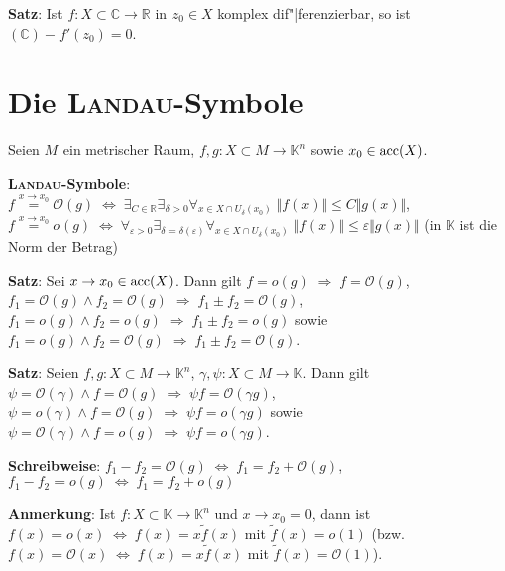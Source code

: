 \textbf{Satz}: Ist $f: X \subset \mathbb{C} \rightarrow \mathbb{R}$
in $z_0 \in X$ komplex dif"|ferenzierbar, so ist
$(\mathbb{C}) - f'(z_0) = 0$.

\section{%
    Die \textsc{Landau}-Symbole%
}

Seien $M$ ein metrischer Raum,
$f, g: X \subset M \rightarrow \mathbb{K}^n$
sowie $x_0 \in \operatorname{acc}(X)$.

\textbf{\textsc{Landau}-Symbole}:
$f \overset{x \to x_0}{=} \mathcal{O}(g) \;\Leftrightarrow\;
\exists_{C \in \mathbb{R}} \exists_{\delta > 0}
\forall_{x \in X \cap U_\delta(x_0)}\;
\Vert f(x) \Vert \le C \Vert g(x) \Vert$, \\
$f \overset{x \to x_0}{=} o(g) \;\Leftrightarrow\;
\forall_{\varepsilon > 0} \exists_{\delta = \delta(\varepsilon)}
\forall_{x \in X \cap U_\delta(x_0)}\;
\Vert f(x) \Vert \le \varepsilon \Vert g(x) \Vert$
\qquad (in $\mathbb{K}$ ist die Norm der Betrag)

\linie

\textbf{Satz}: Sei $x \to x_0 \in \operatorname{acc}(X)$. \qquad
Dann gilt $f = o(g) \;\Rightarrow\; f = \mathcal{O}(g)$, \\
$f_1 = \mathcal{O}(g) \land f_2 = \mathcal{O}(g) \;\Rightarrow\;
f_1 \pm f_2 = \mathcal{O}(g)$, \qquad
$f_1 = o(g) \land f_2 = o(g) \;\Rightarrow\; f_1 \pm f_2 = o(g)$ sowie
$f_1 = o(g) \land f_2 = \mathcal{O}(g) \;\Rightarrow\;
f_1 \pm f_2 = \mathcal{O}(g)$.

\textbf{Satz}: Seien $f, g: X \subset M \rightarrow \mathbb{K}^n$,
$\gamma, \psi: X \subset M \rightarrow \mathbb{K}$.
Dann gilt \\
$\psi = \mathcal{O}(\gamma) \land f = \mathcal{O}(g) \;\Rightarrow\;
\psi f = \mathcal{O}(\gamma g)$, \qquad
$\psi = o(\gamma) \land f = \mathcal{O}(g) \;\Rightarrow\;
\psi f = o(\gamma g)$ sowie \\
$\psi = \mathcal{O}(\gamma) \land f = o(g) \;\Rightarrow\;
\psi f = o(\gamma g)$.

\textbf{Schreibweise}:
$f_1 - f_2 = \mathcal{O}(g) \;\Leftrightarrow\; f_1 = f_2 + \mathcal{O}(g)$,
\qquad $f_1 - f_2 = o(g) \;\Leftrightarrow\; f_1 = f_2 + o(g)$

\textbf{Anmerkung}:
Ist $f: X \subset \mathbb{K} \rightarrow \mathbb{K}^n$ und $x \to x_0 = 0$,
dann ist $f(x) = o(x) \;\Leftrightarrow\; f(x) = x \tilde{f}(x)$
mit $\tilde{f}(x) = o(1)$ \quad
(bzw. $f(x) = \mathcal{O}(x) \;\Leftrightarrow\; f(x) = x \tilde{f}(x)$
mit $\tilde{f}(x) = \mathcal{O}(1)$).


